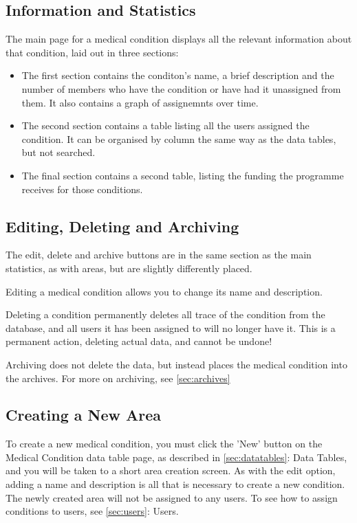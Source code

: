 \documentclass{bhcguides}
\begin{document}
\subsection{Information and Statistics}
\label{ssec:medinfoandstats}

The main page for a medical condition displays all the relevant information about that condition, laid out in three sections:

\begin{itemize}
	\item The first section contains the conditon's name, a brief description and the number of members who have the condition or have had it unassigned from them. It also contains a graph of assignemnts over time.
	\item The second section contains a table listing all the users assigned the condition. It can be organised by column the same way as the data tables, but not searched.
	\item The final section contains a second table, listing the funding the programme receives for those conditions.
\end{itemize}

\subsection{Editing, Deleting and Archiving}
\label{ssec:mededitdelete}

The edit, delete and archive buttons are in the same section as the main statistics, as with areas, but are slightly differently placed.

Editing a medical condition allows you to change its name and description.

Deleting a condition permanently deletes all trace of the condition from the database, and all users it has been assigned to will no longer have it. This is a permanent action, deleting actual data, and cannot be undone!

Archiving does not delete the data, but instead places the medical condition into the archives. For more on archiving, see \autoref{sec:archives}

\subsection{Creating a New Area}
\label{ssec:createmedical}

To create a new medical condition, you must click the 'New' button on the Medical Condition data table page, as described in \autoref{sec:datatables}: Data Tables, and you will be taken to a short area creation screen. As with the edit option, adding a name and description is all that is necessary to create a new condition. The newly created area will not be assigned to any users. To see how to assign conditions to users, see \autoref{sec:users}: Users.
\end{document}
